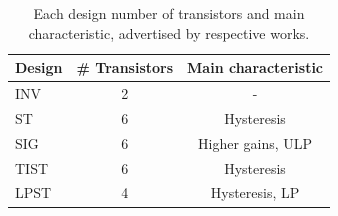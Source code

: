 \documentclass[diss,pgmicro,english]{iiufrgs}
\begin{document}
\begin{table}[]
\centering
\caption{Each design number of transistors and main characteristic, advertised by respective works.}
\label{tab:designHighlight}
\begin{tabular}{lcc}
\hline
Design & \# Transistors & Main characteristic \\ \hline
INV & 2 & - \\ \hline
ST & 6 & Hysteresis \\ \hline
SIG & 6 & Higher gains, ULP \\ \hline
TIST & 6 & Hysteresis \\ \hline
LPST & 4 & Hysteresis, LP \\ \hline
\end{tabular}
\end{table}



\end{document}
